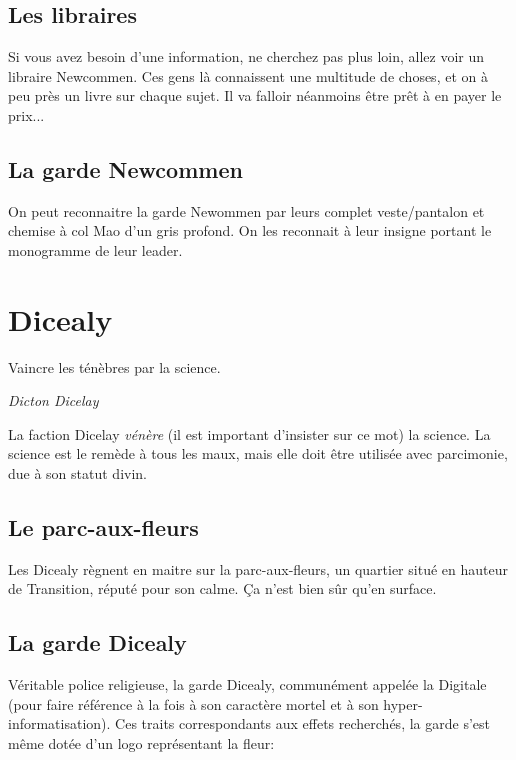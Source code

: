 \documentclass{book}
\begin{document}
\subsection{Les libraires}
Si vous avez besoin d'une information, ne cherchez pas plus loin, allez voir un libraire Newcommen. Ces gens là connaissent une multitude de choses, et on à peu près un livre sur chaque sujet. Il va falloir néanmoins être prêt à en payer le prix...

\subsection{La garde Newcommen}
On peut reconnaitre la garde Newommen par leurs complet veste/pantalon et chemise à col Mao d'un gris profond. On les reconnait à leur insigne portant le monogramme de leur leader.
\begin{figure}[H]
    \centering
    \def\svgwidth{10em}
    
\end{figure}

\section{Dicealy}
\epigraph{Vaincre les ténèbres par la science.}{\textit{Dicton Dicelay}}
La faction Dicelay \emph{vénère} (il est important d'insister sur ce mot) la science. La science est le remède à tous les maux, mais elle doit être utilisée avec parcimonie, due à son statut divin.

\subsection{Le parc-aux-fleurs}
Les Dicealy règnent en maitre sur la parc-aux-fleurs, un quartier situé en hauteur de Transition, réputé pour son calme. Ça n'est bien sûr qu'en surface.

\subsection{La garde Dicealy}
Véritable police religieuse, la garde Dicealy, communément appelée la Digitale (pour faire référence à la fois à son caractère mortel et à son hyper-informatisation).
Ces traits correspondants aux effets recherchés, la garde s'est même dotée d'un logo représentant la fleur:
\begin{figure}[H]
    \centering
    \def\svgwidth{10em}
    
\end{figure}
\end{document}
